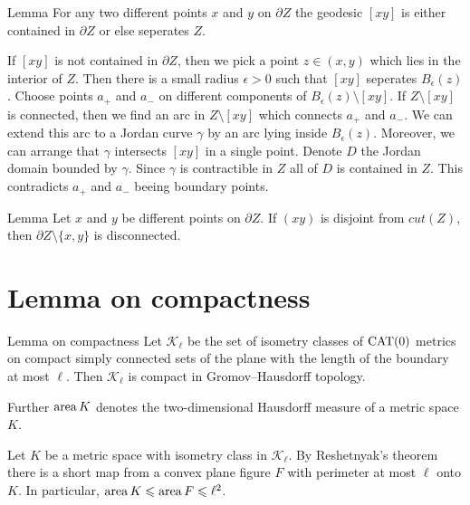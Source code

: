 \documentclass[a4paper,10pt]{amsart}
\begin{document}
\begin{thm}{Lemma}
 For any two different points $x$ and $y$ on $\partial Z$ the geodesic $[xy]$ is either contained in $\partial Z$
 or else seperates $Z$.
\end{thm}

If $[xy]$ is not contained in $\partial Z$, then we pick a point $z\in(x,y)$ which lies in the interior of $Z$. 
Then there is a small radius $\epsilon>0$ such that $[xy]$ seperates $B_\epsilon(z)$. Choose points $a_+$ and $a_-$
on different components  of $B_\epsilon(z)\setminus[xy]$. If $Z\setminus [xy]$ is connected, then we find an arc in $Z\setminus [xy]$
which connects $a_+$ and $a_-$. We can extend this arc to a Jordan curve $\gamma$ by an arc lying inside $B_\epsilon(z)$.
Moreover, we can arrange that $\gamma$ intersects $[xy]$ in a single point. Denote $D$ the Jordan domain bounded by $\gamma$.
Since $\gamma$ is contractible in $Z$ all of $D$ is contained in $Z$. This contradicts  $a_+$ and $a_-$ beeing boundary points.
\qeds

\begin{thm}{Lemma}
 Let $x$ and $y$ be different points on $\partial Z$. If $(xy)$ is disjoint from $cut(Z)$, then $\partial Z\setminus\{x,y\}$
 is disconnected.
\end{thm}


\qeds





\section{Lemma on compactness}

\begin{thm}{Lemma on compactness}\label{lem:compact}
Let $\mathcal{K}_\ell$ be the set of isometry classes of $\mathop{\rm CAT}\nolimits(0)$ metrics on compact simply connected sets of the plane 
with the length of the boundary at most $\ell$.
Then $\mathcal{K}_\ell$ is compact in Gromov--Hausdorff topology.
\end{thm}

Further $\mathop{\rm area}\nolimits K$ denotes the two-dimensional Hausdorff measure of a metric space $K$. 

Let $K$ be a metric space with isometry class in $\mathcal {K}_\ell$.
By Reshetnyak's theorem there is a short map from a convex plane figure $F$ with perimeter at most $\ell$ onto $K$.
In particular, $\mathop{\rm area}\nolimits K \leqslant \mathop{\rm area}\nolimits F 
\leqslant \ell^2$.
\end{document}
